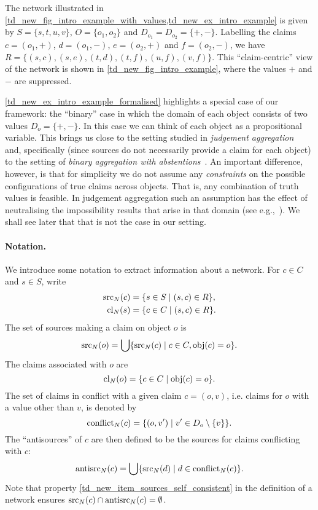 \begin{example}
    \label{td_new_ex_intro_example_formalised}
    The network illustrated in
    \cref{td_new_fig_intro_example_with_values,td_new_ex_intro_example} is
    given by $S = \{s, t, u, v\}$, $O = \{o_1, o_2\}$ and $D_{o_1} = D_{o_2} =
    \{+, -\}$. Labelling the claims $c = (o_1, +)$, $d = (o_1, -)$, $e = (o_2,
    +)$ and $f = (o_2, -)$, we have
    $
        R = \{
            (s, c), (s, e),
            (t, d), (t, f),
            (u, f),
            (v, f)
        \}
    $. This ``claim-centric'' view of the network is shown in
    \cref{td_new_fig_intro_example}, where the values $+$ and $-$ are
    suppressed.
\end{example}

\cref{td_new_ex_intro_example_formalised} highlights a special case of our
framework: the ``binary'' case in which the domain of each object consists of
two values $D_o = \{+, -\}$.  In this case we can
think of each object as a propositional variable. This brings us close to the
setting studied in \emph{judgement aggregation}~\cite{endriss2016ja} and,
specifically (since sources do not necessarily provide a claim for each
object) to the setting of \emph{binary aggregation with
abstentions}~\cite{christoffbinary,dokow}. An important difference, however, is
that for simplicity we do not assume any \emph{constraints} on the possible
configurations of true claims across objects. That is, any combination of truth
values is feasible. In judgement aggregation such an assumption has the effect
of neutralising the impossibility results that arise in that domain (see
e.g.,~\cite{christoffbinary}). We shall see later that that is not the case in
our setting.

\paragraph{Notation.}

We introduce some notation to extract information about a network. For $c \in
C$ and $s \in S$, write
\begin{align*}
    \operatorname{src}_N(c) &= \{s \in S \mid (s, c) \in R\},\\
    \operatorname{cl}_N(s) &= \{c \in C \mid (s, c) \in R\}.
\end{align*}
The set of sources making a claim on object $o$ is
\[
    \operatorname{src}_N(o) = \bigcup\{\operatorname{src}_N(c) \mid c \in C, \operatorname{obj}(c) = o\}.
\]
The claims associated with $o$ are
\[
    \operatorname{cl}_N(o) = \{c \in C \mid \operatorname{obj}(c) = o\}.
\]
The set of claims in conflict with a given claim $c = (o, v)$, i.e.  claims for
$o$ with a value other than $v$, is denoted by
\[
    \operatorname{conflict}_N(c) = \{(o, v') \mid v' \in D_o \setminus \{v\}\}.
\]
The ``antisources'' of $c$ are then defined to be the sources for claims
conflicting with $c$:
\[
    \operatorname{antisrc}_N(c) = \bigcup\{\operatorname{src}_N(d) \mid d \in \operatorname{conflict}_N(c)\}.
\]
Note that property \cref{td_new_item_sources_self_consistent} in the definition
of a network ensures $\operatorname{src}_N(c) \cap \operatorname{antisrc}_N(c) = \emptyset$.

